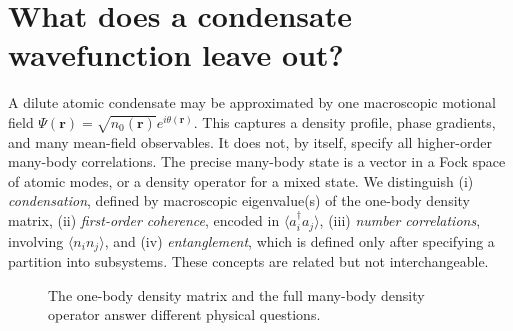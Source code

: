 \documentclass[11pt,a4paper]{article}
\newcommand{\tr}{\operatorname{Tr}}
\begin{document}
\section{What does a condensate wavefunction leave out?}
A dilute atomic condensate may be approximated by one macroscopic motional field $\Psi(\mathbf r)=\sqrt{n_0(\mathbf r)}e^{i\theta(\mathbf r)}$. This captures a density profile, phase gradients, and many mean-field observables. It does not, by itself, specify all higher-order many-body correlations. The precise many-body state is a vector in a Fock space of atomic modes, or a density operator for a mixed state.
We distinguish (i) \emph{condensation}, defined by macroscopic eigenvalue(s) of the one-body density matrix, (ii) \emph{first-order coherence}, encoded in $\langle a_i^\dagger a_j\rangle$, (iii) \emph{number correlations}, involving $\langle n_i n_j\rangle$, and (iv) \emph{entanglement}, which is defined only after specifying a partition into subsystems. These concepts are related but not interchangeable.
\begin{figure}[h!]
\centering
{}
\caption{The one-body density matrix and the full many-body density operator answer different physical questions.}
\end{figure}
\end{document}
